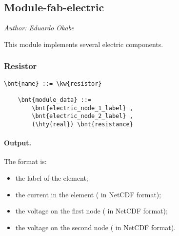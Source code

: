 % 
% 
% 
% 
% 
% 
% 
% 
% 


\subsection{Module-fab-electric}
\label{sec:MODULE:FAB-ELECTRIC}
\emph{Author: Eduardo Okabe}

\noindent
This module implements several electric components.

\subsubsection{Resistor}
\label{sec:MODULE:FAB-ELECTRIC:RESISTOR}
\begin{Verbatim}[commandchars=\\\{\}]
    \bnt{name} ::= \kw{resistor}

    \bnt{module_data} ::=
        \bnt{electric_node_1_label} ,
        \bnt{electric_node_2_label} ,
        (\hty{real}) \bnt{resistance}
\end{Verbatim}

\paragraph{Output.}
\label{sec:MODULE:FAB-ELECTRIC:RESISTOR:OUTPUT}
The format is:
\begin{itemize}
\item the label of the element;
\item the current in the element ( in NetCDF format);
\item the voltage on the first node ( in NetCDF format);
\item the voltage on the second node ( in NetCDF format).
\end{itemize}

